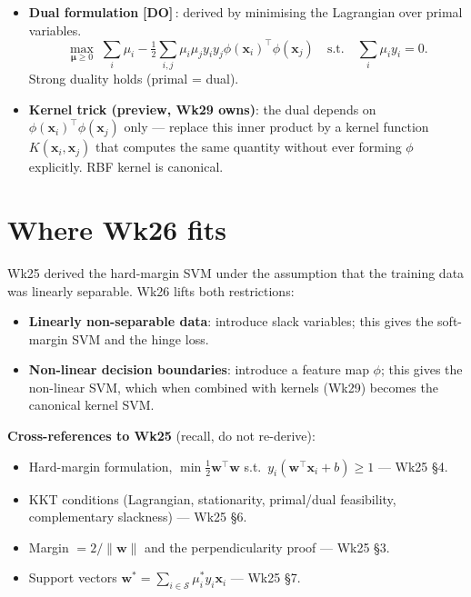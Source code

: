 \documentclass[11pt, a4paper]{article}
\newcommand{\doflag}{\textcolor{defBd}{\textbf{[DO]}}\,}
\begin{document}
\begin{tldrbox}
\begin{itemize}[leftmargin=*]
  \item \textbf{Dual formulation} \doflag{}: derived by minimising the Lagrangian over primal variables.
  \[
  \max_{\boldsymbol\mu \ge 0}\;\sum_i \mu_i - \tfrac{1}{2}\sum_{i,j} \mu_i \mu_j y_i y_j \phi(\mathbf{x}_i)^\top\phi(\mathbf{x}_j) \quad\text{s.t.}\quad \sum_i \mu_i y_i = 0.
  \]
  Strong duality holds (primal = dual).
  \item \textbf{Kernel trick (preview, Wk29 owns)}: the dual depends on $\phi(\mathbf{x}_i)^\top\phi(\mathbf{x}_j)$ only — replace this inner product by a kernel function $K(\mathbf{x}_i, \mathbf{x}_j)$ that computes the same quantity without ever forming $\phi$ explicitly. RBF kernel is canonical.
\end{itemize}
\end{tldrbox}

\section{Where Wk26 fits}

Wk25 derived the hard-margin SVM under the assumption that the training data was linearly separable. Wk26 lifts both restrictions:
\begin{itemize}
  \item \textbf{Linearly non-separable data}: introduce slack variables; this gives the soft-margin SVM and the hinge loss.
  \item \textbf{Non-linear decision boundaries}: introduce a feature map $\phi$; this gives the non-linear SVM, which when combined with kernels (Wk29) becomes the canonical kernel SVM.
\end{itemize}

\textbf{Cross-references to Wk25} (recall, do not re-derive):
\begin{itemize}
  \item Hard-margin formulation, $\min \tfrac{1}{2}\mathbf{w}^\top\mathbf{w}$ s.t.\ $y_i(\mathbf{w}^\top\mathbf{x}_i + b) \ge 1$ — Wk25 §4.
  \item KKT conditions (Lagrangian, stationarity, primal/dual feasibility, complementary slackness) — Wk25 §6.
  \item Margin $= 2/\|\mathbf{w}\|$ and the perpendicularity proof — Wk25 §3.
  \item Support vectors $\mathbf{w}^* = \sum_{i\in\mathcal{S}}\mu_i^* y_i\mathbf{x}_i$ — Wk25 §7.
\end{itemize}
\end{document}
